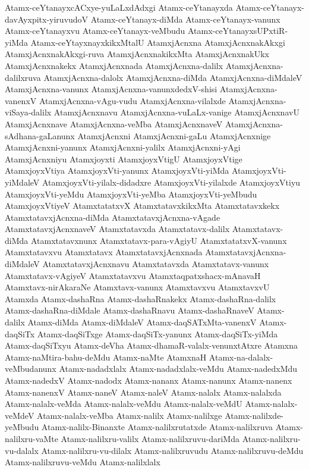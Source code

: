 {Atamx-ceYtanayxcACxye-yuLaLxdAdxgi
Atamx-ceYtanayxda
Atamx-ceYtanayx-davAyxpitx-yiruvudoV
Atamx-ceYtanayx-diMda
Atamx-ceYtanayx-vanunx
Atamx-ceYtanayxvu
Atamx-ceYtanayx-veMbudu
Atamx-ceYtanayxsUPxtiR-yiMda
Atamx-ceYtayxnayxkikxMtalU
AtamxjAcnxna
AtamxjAcnxnakAkxgi
AtamxjAcnxnakAkxgi-ruva
AtamxjAcnxnakikxMta
AtamxjAcnxnakUkx
AtamxjAcnxnakekx
AtamxjAcnxnada
AtamxjAcnxna-dalilx
AtamxjAcnxna-dalilxruva
AtamxjAcnxna-dalolx
AtamxjAcnxna-diMda
AtamxjAcnxna-diMdaleV
AtamxjAcnxna-vanunx
AtamxjAcnxna-vanunxdedxV-shisi
AtamxjAcnxna-vanenxV
AtamxjAcnxna-vAgu-vudu
AtamxjAcnxna-vilalxde
AtamxjAcnxna-viSaya-dalilx
AtamxjAcnxnavu
AtamxjAcnxna-vuLaLx-vanige
AtamxjAcnxnavU
AtamxjAcnxnave
AtamxjAcnxna-veMba
AtamxjAcnxnaveV
AtamxjAcnxna-sAdhana-gaLanunx
AtamxjAcnxni
AtamxjAcnxni-gaLu
AtamxjAcnxnige
AtamxjAcnxni-yanunx
AtamxjAcnxni-yalilx
AtamxjAcnxni-yAgi
AtamxjAcnxniyu
Atamxjoyxti
AtamxjoyxVtigU
AtamxjoyxVtige
AtamxjoyxVtiya
AtamxjoyxVti-yanunx
AtamxjoyxVti-yiMda
AtamxjoyxVti-yiMdaleV
AtamxjoyxVti-yilalx-didadxre
AtamxjoyxVti-yilalxde
AtamxjoyxVtiyu
AtamxjoyxVti-yeMdu
AtamxjoyxVti-yeMba
AtamxjoyxVti-yeMbudu
AtamxjoyxVtiyeV
AtamxtatatxvX
AtamxtatavxkikxMta
Atamxtatavxkekx
AtamxtatavxjAcnxna-diMda
AtamxtatavxjAcnxna-vAgade
AtamxtatavxjAcnxnaveV
Atamxtatavxda
Atamxtatavx-dalilx
Atamxtatavx-diMda
Atamxtatavxnunx
Atamxtatavx-para-vAgiyU
AtamxtatatxvX-vanunx
Atamxtatavxvu
Atamxtatavx
AtamxtatavxjAcnxnada
AtamxtatavxjAcnxna-diMdaleV
AtamxtatavxjAcnxnavu
Atamxtatavxda
Atamxtatavx-vanunx
Atamxtatavx-vAgiyeV
Atamxtatavxvu
Atamxtaqpatxshacx-mAnavaH
Atamxtavx-nirAkaraNe
Atamxtavx-vanunx
Atamxtavxvu
AtamxtavxvU
Atamxda
Atamx-dashaRna
Atamx-dashaRnakekx
Atamx-dashaRna-dalilx
Atamx-dashaRna-diMdale
Atamx-dashaRnavu
Atamx-dashaRnaveV
Atamx-dalilx
Atamx-diMda
Atamx-diMdaleV
Atamx-daqSATxMta-vanenxV
Atamx-daqSiTx
Atamx-daqSiTxge
Atamx-daqSiTx-yanunx
Atamx-daqSiTx-yiMda
Atamx-daqSiTxyu
Atamx-deVha
Atamx-dhamaR-valalx-venunxtAtxre
Atamxna
Atamx-naMtira-bahu-deMdu
Atamx-naMte
AtamxnaH
Atamx-na-dalalx-veMbudanunx
Atamx-nadadxlalx
Atamx-nadadxlalx-veMdu
Atamx-nadedxMdu
Atamx-nadedxV
Atamx-nadodx
Atamx-nananx
Atamx-nanunx
Atamx-nanenx
Atamx-nanenxV
Atamx-naneV
Atamx-naleV
Atamx-nalalx
Atamx-nalalxda
Atamx-nalalx-veMda
Atamx-nalalx-veMdu
Atamx-nalalx-veMdU
Atamx-nalalx-veMdeV
Atamx-nalalx-veMba
Atamx-nalilx
Atamx-nalilxge
Atamx-nalilxde-yeMbudu
Atamx-nalilx-Binanxte
Atamx-nalilxrutatxde
Atamx-nalilxruva
Atamx-nalilxru-vaMte
Atamx-nalilxru-valilx
Atamx-nalilxruvu-dariMda
Atamx-nalilxru-vu-dalalx
Atamx-nalilxru-vu-dilalx
Atamx-nalilxruvudu
Atamx-nalilxruvu-deMdu
Atamx-nalilxruvu-veMdu
Atamx-nalilxlalx
}
